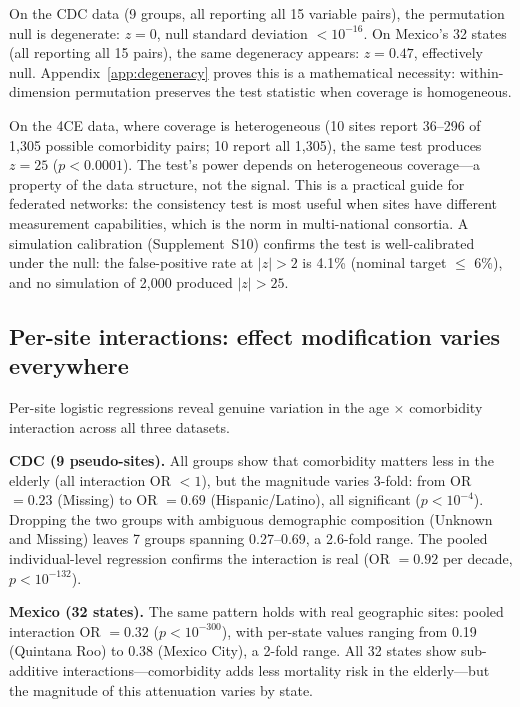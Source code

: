 \documentclass{article}
\begin{document}
On the CDC data (9 groups, all reporting all 15 variable pairs), the
permutation null is degenerate: $z = 0$, null standard deviation
$< 10^{-16}$.  On Mexico's 32 states (all reporting all 15 pairs), the
same degeneracy appears: $z = 0.47$, effectively null.
Appendix~\ref{app:degeneracy} proves this is a mathematical necessity:
within-dimension permutation preserves the test statistic when coverage is
homogeneous.

On the 4CE data, where coverage is heterogeneous (10 sites report
36--296 of 1,305 possible comorbidity pairs; 10 report all 1,305), the
same test produces $z = 25$ ($p < 0.0001$).  The test's power depends on
heterogeneous coverage---a property of the data structure, not the signal.
This is a practical guide for federated networks: the consistency test is
most useful when sites have different measurement capabilities,
which is the norm in multi-national consortia.  A simulation calibration
(Supplement~S10) confirms the test is well-calibrated under the null:
the false-positive rate at $|z| > 2$ is 4.1\% (nominal target
$\leq$ 6\%), and no simulation of 2{,}000 produced $|z| > 25$.


\subsection{Per-site interactions: effect modification varies everywhere}

Per-site logistic regressions reveal genuine variation in the
age $\times$ comorbidity interaction across all three datasets.

\textbf{CDC (9 pseudo-sites).}  All groups show that comorbidity matters
less in the elderly (all interaction OR $< 1$), but the magnitude varies
3-fold: from OR $= 0.23$ (Missing) to OR $= 0.69$ (Hispanic/Latino), all
significant ($p < 10^{-4}$).  Dropping the two groups with ambiguous
demographic composition (Unknown and Missing) leaves 7 groups spanning
0.27--0.69, a 2.6-fold range.  The pooled individual-level regression
confirms the interaction is real (OR $= 0.92$ per decade,
$p < 10^{-132}$).

\textbf{Mexico (32 states).}  The same pattern holds with real geographic
sites: pooled interaction OR $= 0.32$ ($p < 10^{-300}$), with per-state
values ranging from 0.19 (Quintana Roo) to 0.38 (Mexico City), a 2-fold
range.  All 32 states show sub-additive interactions---comorbidity adds
less mortality risk in the elderly---but the magnitude of this attenuation
varies by state.
\end{document}
